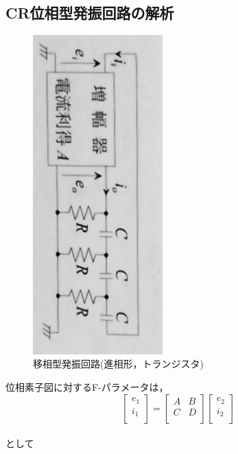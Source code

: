 \documentclass[10pt, a4j, dvipdfmx]{jarticle}
\makeatletter
\newcommand{\figcaption}[1]{\def\@captype{figure}\caption{#1}}
\makeatother
\begin{document}
    \subsection*{CR位相型発振回路の解析}
    \begin{figure}[H]
        \centering
        \includegraphics[width=50mm, angle=90]{txt-1.jpg}
        \figcaption{移相型発振回路(進相形，トランジスタ)}
        \label{fig:txt-1}
    \end{figure}
    位相素子図に対するF-パラメータは，\\
    \begin{equation*}
        \begin{bmatrix}
            e_1 \\
            i_1 \\
        \end{bmatrix}
        =
        \begin{bmatrix}
            A & B \\
            C & D \\
        \end{bmatrix}
        \begin{bmatrix}
            e_2 \\
            i_2 \\
        \end{bmatrix}
    \end{equation*}
    \\として\\
\end{document}
